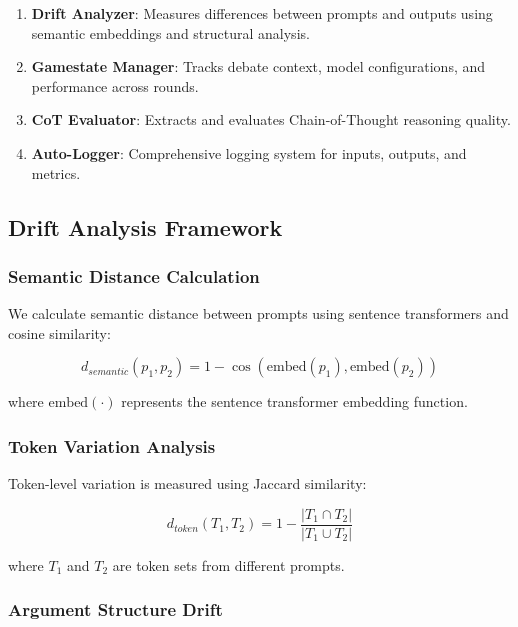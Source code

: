 \documentclass[11pt]{article}
\begin{document}
\begin{enumerate}
    \item \textbf{Drift Analyzer}: Measures differences between prompts and outputs using semantic embeddings and structural analysis.
    \item \textbf{Gamestate Manager}: Tracks debate context, model configurations, and performance across rounds.
    \item \textbf{CoT Evaluator}: Extracts and evaluates Chain-of-Thought reasoning quality.
    \item \textbf{Auto-Logger}: Comprehensive logging system for inputs, outputs, and metrics.
\end{enumerate}

\subsection{Drift Analysis Framework}

\subsubsection{Semantic Distance Calculation}

We calculate semantic distance between prompts using sentence transformers and cosine similarity:

\begin{equation}
d_{semantic}(p_1, p_2) = 1 - \cos(\text{embed}(p_1), \text{embed}(p_2))
\end{equation}

where $\text{embed}(\cdot)$ represents the sentence transformer embedding function.

\subsubsection{Token Variation Analysis}

Token-level variation is measured using Jaccard similarity:

\begin{equation}
d_{token}(T_1, T_2) = 1 - \frac{|T_1 \cap T_2|}{|T_1 \cup T_2|}
\end{equation}

where $T_1$ and $T_2$ are token sets from different prompts.

\subsubsection{Argument Structure Drift}
\end{document}

